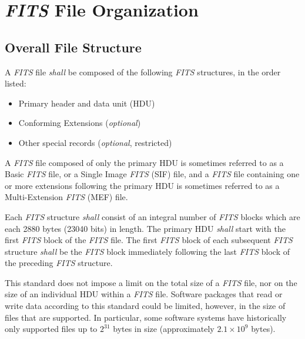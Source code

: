 \documentclass[11pt,makeidx]{book}     %
\begin{document}
\chapter{{\em FITS\/} File Organization}
  \label{s:org}

  \section{Overall File Structure}

   A {\em FITS\/} file {\em shall} be composed of the following {\em FITS\/} 
   structures, in the 
   order
   listed:
   \begin{itemize}
   \item Primary header and data unit (HDU)
   \item Conforming Extensions
   ({\em optional})
   \item Other special records ({\em optional}, restricted)
   \end{itemize}
\noindent
   A {\em FITS\/} file composed of only the primary HDU is sometimes referred to
   as a Basic {\em FITS\/} file, or a Single Image {\em FITS\/} (SIF) file, and a
   {\em FITS\/} file  containing one or more extensions following the primary HDU
   is sometimes referred to as a Multi-Extension {\em FITS\/} (MEF) file. 
   
   Each {\em FITS\/} structure {\em shall}  consist of an
   integral number of {\em FITS\/} blocks which are each 2880 bytes (23040 bits)
   in length. The primary HDU {\em shall} start  with the
   first {\em FITS\/} block of the {\em FITS\/} file.  The first {\em FITS\/}
   block of each subsequent  {\em FITS\/} structure {\em
   shall} be  the {\em FITS\/} block immediately  following the last {\em FITS\/}
   block of the preceding {\em FITS\/} structure.  

This standard does not impose a limit on the total size of 
a {\em FITS\/} file, nor on the size of an individual HDU within 
a {\em FITS\/} file. Software packages that read or write data 
according to this standard could be limited, however, in the size of
files that are supported. In particular, some software systems have 
historically only supported files up to $2^{31}$ bytes in size 
(approximately $2.1\times10^9$ bytes). 
\end{document}
